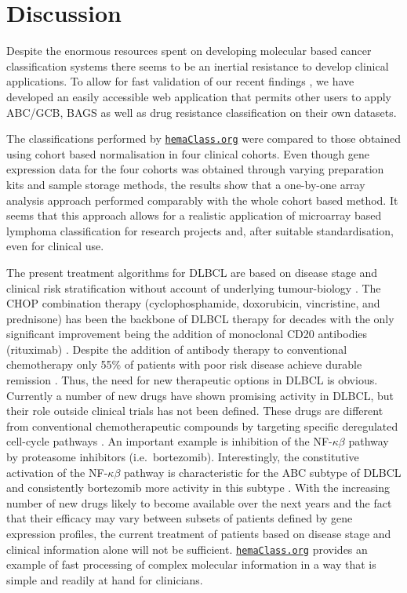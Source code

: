\documentclass{article}
\newcommand{\hemaClass}{\href{http://hemaClass.org}{\texttt{hemaClass.org}}}
\begin{document}
\section{Discussion}
Despite the enormous resources spent on developing molecular based cancer classification systems there seems to be an inertial resistance to develop clinical applications.
To allow for fast validation of our recent findings \citep{Dybkaer2013, Falgreen2013c}, we have developed an easily accessible web application that permits other users to apply ABC/GCB, BAGS as well as drug resistance classification on their own datasets.

The classifications performed by \hemaClass{} were compared to those obtained using cohort based normalisation in four clinical cohorts.
Even though gene expression data for the four cohorts was obtained through varying preparation kits and sample storage methods, the results show that a one-by-one array analysis approach performed comparably with the whole cohort based method.
It seems that this approach allows for a realistic application of microarray based lymphoma classification for research projects and, after suitable standardisation, even for clinical use.

The present treatment algorithms for DLBCL are based on disease stage and clinical risk stratification without account of underlying tumour-biology \citep{Schmoll2012}.
The CHOP combination therapy (cyclophosphamide, doxorubicin, vincristine, and prednisone) has been the backbone of DLBCL therapy for decades with the only significant improvement being the addition of monoclonal CD20 antibodies (rituximab) \citep{Coiffier2002a}.
Despite the addition of antibody therapy to conventional chemotherapy only 55\% of patients with poor risk disease achieve durable remission \citep{Ziepert2010}.
Thus, the need for new therapeutic options in DLBCL is obvious.
Currently a number of new drugs have shown promising activity in DLBCL, but their role outside clinical trials has not been defined.
These drugs are different from conventional chemotherapeutic compounds by targeting specific deregulated cell-cycle pathways \citep{Friedberg2011}.
An important example is inhibition of the NF-$\kappa\beta$ pathway by proteasome inhibitors (i.e.\ bortezomib).
Interestingly, the constitutive activation of the NF-$\kappa\beta$ pathway is characteristic for the ABC subtype of DLBCL and consistently bortezomib more activity in this subtype \citep{Nogai2013}.
With the increasing number of new drugs likely to become available over the next years and the fact that their efficacy may vary between subsets of patients defined by gene expression profiles, the current treatment of patients based on disease stage and clinical information alone will not be sufficient.
\hemaClass{} provides an example of fast processing of complex molecular information in a way that is simple and readily at hand for clinicians.
\end{document}
